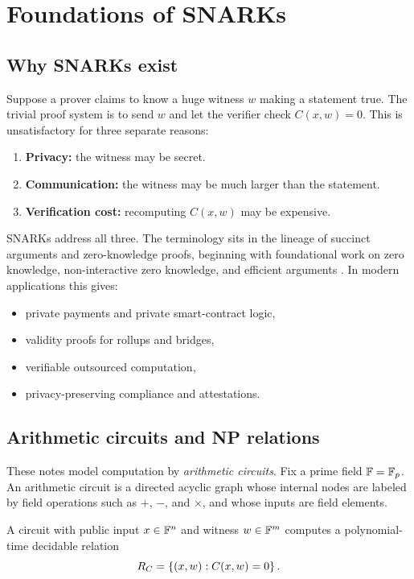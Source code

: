 \section{Foundations of SNARKs}

\subsection{Why SNARKs exist}

Suppose a prover claims to know a huge witness $w$ making a statement true. The trivial proof system is to send $w$ and let the verifier check $C(x,w)=0$. This is unsatisfactory for three separate reasons:
\begin{enumerate}[leftmargin=2em]
    \item \textbf{Privacy:} the witness may be secret.
    \item \textbf{Communication:} the witness may be much larger than the statement.
    \item \textbf{Verification cost:} recomputing $C(x,w)$ may be expensive.
\end{enumerate}

SNARKs address all three. The terminology sits in the lineage of succinct arguments and zero-knowledge proofs, beginning with foundational work on zero knowledge, non-interactive zero knowledge, and efficient arguments \cite{GoldwasserMicaliRackoff1989,BlumFeldmanMicali1988,Kilian1992}. In modern applications this gives:
\begin{itemize}[leftmargin=2em]
    \item private payments and private smart-contract logic,
    \item validity proofs for rollups and bridges,
    \item verifiable outsourced computation,
    \item privacy-preserving compliance and attestations.
\end{itemize}

\subsection{Arithmetic circuits and NP relations}

These notes model computation by \emph{arithmetic circuits}. Fix a prime field $\mathbb{F}=\mathbb{F}_p$. An arithmetic circuit is a directed acyclic graph whose internal nodes are labeled by field operations such as $+$, $-$, and $\times$, and whose inputs are field elements.

A circuit with public input $x\in \mathbb{F}^n$ and witness $w\in \mathbb{F}^m$ computes a polynomial-time decidable relation
\[
R_C = \left\{(x,w) : C(x,w)=0\right\}.
\]

